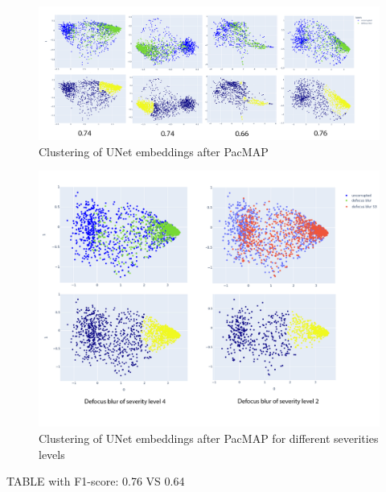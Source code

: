 \begin{figure}[htb]
	\begin{center}
		\includegraphics[width=\linewidth]{bilder/unet-embeddings/PacMAP.png}
		\caption{Clustering of UNet embeddings after PacMAP}\label{fig:unet-clustering}
	\end{center}
\end{figure}

\begin{figure}[htb]
	\begin{center}
		\includegraphics[width=0.6\linewidth]{bilder/unet-embeddings/db-levels.png}
		\caption{Clustering of UNet embeddings after PacMAP for different severities levels}\label{fig:unet-clustering-sev-levels}
	\end{center}
\end{figure}

TABLE with F1-score:
0.76 VS 0.64